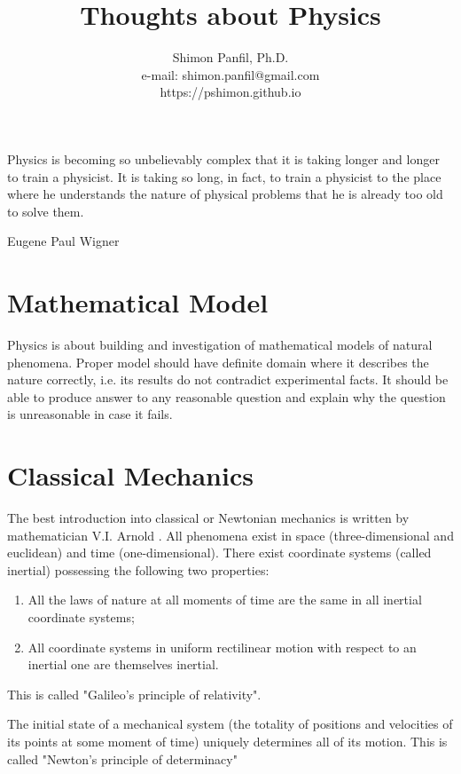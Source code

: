 \documentclass[11pt]{report}
\title{Thoughts about Physics}
\author{Shimon Panfil, Ph.D.\\
e-mail: shimon.panfil@gmail.com\\
https://pshimon.github.io}
\begin{document}
                        
\maketitle
\epigraph{Physics is becoming so unbelievably complex that it is taking longer
and longer to train a physicist. It is taking so long, in fact, to train a 
physicist to the place where he understands the nature of physical problems that 
he is already too old to solve them.}{Eugene Paul Wigner}
\tableofcontents                        
\chapter{Mathematical Model }
\label {math-mod}
Physics is about building and investigation of mathematical models  of natural phenomena. 
Proper model should have definite domain where it describes the nature correctly, i.e.
its results do not contradict experimental facts. It should be able to produce answer
to any reasonable question and explain why the question is unreasonable in case it fails.
\chapter{Classical Mechanics}
\label{class-mech}
The best introduction into classical or Newtonian mechanics is written by mathematician V.I. Arnold \cite{arnold-cm}.
All phenomena exist in space (three-dimensional and euclidean) and time (one-dimensional).
There exist coordinate systems (called inertial) possessing the following two properties:
\begin{enumerate}
    \item All the laws of nature at all moments of time are the same in all inertial coordinate systems;
\item  All coordinate systems in uniform rectilinear motion with respect to an inertial one are themselves inertial.
\end{enumerate}
This is called "Galileo's principle of relativity".


The initial state of a mechanical system (the totality of positions and
velocities of its points at some moment of time) uniquely determines all of
its motion. This is called "Newton's principle of determinacy"
\printbibliography[
heading=bibintoc,
title={References}
] 
\clearpage
\end{document}
